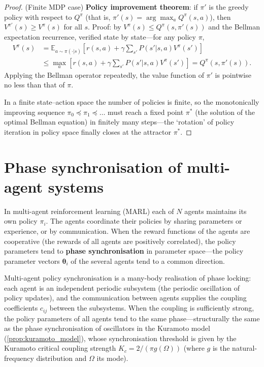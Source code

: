 \begin{proof}
(Finite MDP case) \textbf{Policy improvement theorem}: if $\pi'$ is the greedy policy with respect to $Q^{\pi}$ (that is, $\pi'(s) = \arg\max_a Q^{\pi}(s,a)$), then $V^{\pi'}(s) \ge V^{\pi}(s)$ for all $s$. Proof: by $V^{\pi}(s) \le Q^{\pi}(s, \pi'(s))$ and the Bellman expectation recurrence, verified state by state---for any policy $\pi$,
\[
\begin{aligned}
V^{\pi}(s) &= \mathbb{E}_{a \sim \pi(\cdot|s)}\left[ r(s,a) + \gamma \sum_{s'} P(s'|s,a) V^{\pi}(s') \right]\\
&\le \max_a \left[ r(s,a) + \gamma \sum_{s'} P(s'|s,a) V^{\pi}(s') \right] = Q^{\pi}(s, \pi'(s)).
\end{aligned}
\]
Applying the Bellman operator repeatedly, the value function of $\pi'$ is pointwise no less than that of $\pi$.

In a finite state--action space the number of policies is finite, so the monotonically improving sequence $\pi_0 \preceq \pi_1 \preceq \dots$ must reach a fixed point $\pi^*$ (the solution of the optimal Bellman equation) in finitely many steps---the `rotation' of policy iteration in policy space finally closes at the attractor $\pi^*$.
\end{proof}

\section{Phase synchronisation of multi-agent systems}

\begin{definition}\label{def:multi_agent_sync}
In multi-agent reinforcement learning (MARL) each of $N$ agents maintains its own policy $\pi_i$. The agents coordinate their policies by sharing parameters or experience, or by communication. When the reward functions of the agents are cooperative (the rewards of all agents are positively correlated), the policy parameters tend to \textbf{phase synchronisation} in parameter space---the policy parameter vectors $\boldsymbol{\theta}_i$ of the several agents tend to a common direction.

Multi-agent policy synchronisation is a many-body realisation of phase locking: each agent is an independent periodic subsystem (the periodic oscillation of policy updates), and the communication between agents supplies the coupling coefficients $c_{ij}$ between the subsystems. When the coupling is sufficiently strong, the policy parameters of all agents tend to the same phase---structurally the same as the phase synchronisation of oscillators in the Kuramoto model (\cref{prop:kuramoto_model}), whose synchronisation threshold is given by the Kuramoto critical coupling strength $K_c = 2/(\pi g(\Omega))$ (where $g$ is the natural-frequency distribution and $\Omega$ its mode).
\end{definition}

